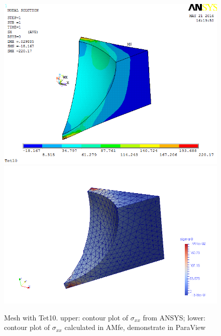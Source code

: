 \begin{figure}[htbp]
	\begin{center}
		\includegraphics[width=13cm,clip]{Tet10_Sxx.png} 		
		\includegraphics[width=13cm,clip]{Tet10_Sxx_P.png} 		
		\caption{Mesh with Tet10. upper: contour plot of $\sigma_{xx}$ from ANSYS; lower: contour plot of $\sigma_{xx}$ calculated in AMfe, demonstrate in ParaView} \label{fig: Tet10_Sxx}
	\end{center}
\end{figure}

